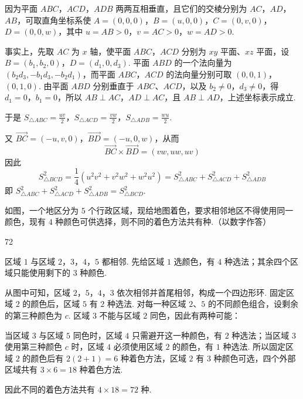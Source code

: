 \begin{solution}
因为平面 \(ABC\)，\(ACD\)，\(ADB\) 两两互相垂直，且它们的交棱分别为 \(AC\)，\(AD\)，\(AB\)，可取直角坐标系使 \(A=(0,0,0)\)，\(B=(u,0,0)\)，\(C=(0,v,0)\)，\(D=(0,0,w)\)，其中 \(u=AB>0\)，\(v=AC>0\)，\(w=AD>0\).

事实上，先取 \(AC\) 为 \(x\) 轴，使平面 \(ABC\)，\(ACD\) 分别为 \(xy\) 平面、\(xz\) 平面，设 \(B=(b_1,b_2,0)\)，\(D=(d_1,0,d_3)\). 平面 \(ABD\) 的一个法向量为 \((b_2d_3,-b_1d_3,-b_2d_1)\)，而平面 \(ABC\)，\(ACD\) 的法向量分别可取 \((0,0,1)\)，\((0,1,0)\). 由平面 \(ABD\) 分别垂直于 \(ABC\)、\(ACD\)，以及 \(b_2\ne0\)，\(d_3\ne0\)，得 \(d_1=0\)，\(b_1=0\)，所以 \(AB\perp AC\)，\(AD\perp AC\)，且 \(AB\perp AD\)，上述坐标表示成立.

于是 \(S_{\triangle ABC}=\frac{uv}{2}\)，\(S_{\triangle ACD}=\frac{vw}{2}\)，\(S_{\triangle ADB}=\frac{wu}{2}\).

又 \(\overrightarrow{BC}=(-u,v,0)\)，\(\overrightarrow{BD}=(-u,0,w)\)，从而
\[
\overrightarrow{BC}\times\overrightarrow{BD}=(vw,uw,uv)
\]
因此
\[
S_{\triangle BCD}^{2}=\frac14\left(u^{2}v^{2}+v^{2}w^{2}+w^{2}u^{2}\right)=S_{\triangle ABC}^{2}+S_{\triangle ACD}^{2}+S_{\triangle ADB}^{2}
\]
即 \(S_{\triangle ABC}^{2}+S_{\triangle ACD}^{2}+S_{\triangle ADB}^{2}=S_{\triangle BCD}^{2}\).
\end{solution}

\begin{problem}
如图，一个地区分为 \(5\) 个行政区域，现给地图着色，要求相邻地区不得使用同一颜色，现有 \(4\) 种颜色可供选择，则不同的着色方法共有\fillinblank{}种.（以数字作答）


\end{problem}

\begin{answer}
72
\end{answer}

\begin{solution}
区域 \(1\) 与区域 \(2\)，\(3\)，\(4\)，\(5\) 都相邻. 先给区域 \(1\) 选颜色，有 \(4\) 种选法；其余四个区域只能使用剩下的 \(3\) 种颜色.

从图中可知，区域 \(2\)，\(5\)，\(4\)，\(3\) 依次相邻并首尾相邻，构成一个四边形环. 固定区域 \(2\) 的颜色后，区域 \(5\) 有 \(2\) 种选法. 对每一种区域 \(2\)、\(5\) 的不同颜色组合，设剩余的第三种颜色为 \(c\). 区域 \(3\) 不能与区域 \(2\) 同色，因此有两种可能：

当区域 \(3\) 与区域 \(5\) 同色时，区域 \(4\) 只需避开这一种颜色，有 \(2\) 种选法；当区域 \(3\) 使用第三种颜色 \(c\) 时，区域 \(4\) 必须使用区域 \(2\) 的颜色，有 \(1\) 种选法. 所以固定区域 \(2\) 的颜色后有 \(2(2+1)=6\) 种着色方法，区域 \(2\) 有 \(3\) 种颜色可选，四个外部区域共有 \(3\times6=18\) 种着色方法.

因此不同的着色方法共有 \(4\times18=72\) 种.
\end{solution}

